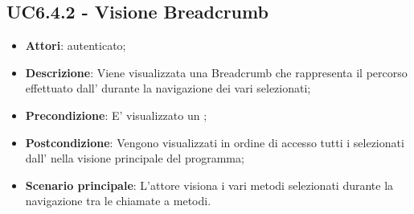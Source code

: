 \subsection{UC6.4.2 - Visione Breadcrumb}
\label{ssec:UC6.4.2}
\begin{itemize}
\item \textbf{Attori}:  autenticato;
\item \textbf{Descrizione}: Viene visualizzata una Breadcrumb che rappresenta il percorso effettuato dall' durante la navigazione dei vari  selezionati;
\item \textbf{Precondizione}: E' visualizzato un ;
\item \textbf{Postcondizione}: Vengono visualizzati in ordine di accesso tutti i  selezionati dall' nella visione principale del programma;
\item \textbf{Scenario principale}: L'attore visiona i vari metodi selezionati durante la navigazione tra le chiamate a metodi.
\end{itemize}
